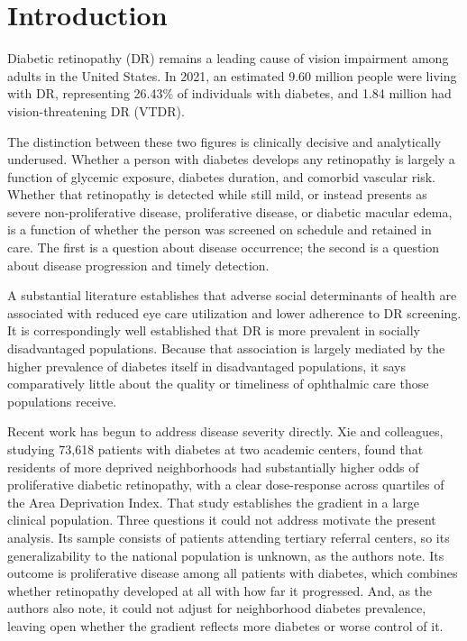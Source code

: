 \documentclass[11pt]{article}
\begin{document}
\clearpage

\section{Introduction}

Diabetic retinopathy (DR) remains a leading cause of vision impairment among
adults in the United States.\citep{lundeen2023,aao2024ppp} In 2021, an estimated
9.60 million people were living with DR, representing 26.43\% of individuals
with diabetes, and 1.84 million had vision-threatening DR
(VTDR).\citep{lundeen2023}

The distinction between these two figures is clinically decisive and
analytically underused. Whether a person with diabetes develops any retinopathy
is largely a function of glycemic exposure, diabetes duration, and comorbid
vascular risk. Whether that retinopathy is detected while still mild, or instead
presents as severe non-proliferative disease, proliferative disease, or diabetic
macular edema, is a function of whether the person was screened on schedule and
retained in care.\citep{aao2024ppp,weng2024,jani2017} The first is a question
about disease occurrence; the second is a question about disease progression and
timely detection.

A substantial literature establishes that adverse social determinants of health
are associated with reduced eye care utilization and lower adherence to DR
screening.\citep{chaudhury2024,ravindranath2023,taccheri2023} It is
correspondingly well established that DR is more prevalent in socially
disadvantaged populations. Because that association is largely mediated by the
higher prevalence of diabetes itself in disadvantaged populations, it says
comparatively little about the quality or timeliness of ophthalmic care those
populations receive.

Recent work has begun to address disease severity directly. Xie and colleagues,
studying 73,618 patients with diabetes at two academic centers, found that
residents of more deprived neighborhoods had substantially higher odds of
proliferative diabetic retinopathy, with a clear dose-response across quartiles
of the Area Deprivation Index.\citep{xie2025} That study establishes the
gradient in a large clinical population. Three questions it could not address
motivate the present analysis. Its sample consists of patients attending
tertiary referral centers, so its generalizability to the national population is
unknown, as the authors note. Its outcome is proliferative disease among all
patients with diabetes, which combines whether retinopathy developed at all with
how far it progressed. And, as the authors also note, it could not adjust for
neighborhood diabetes prevalence, leaving open whether the gradient reflects
more diabetes or worse control of it.
\end{document}
